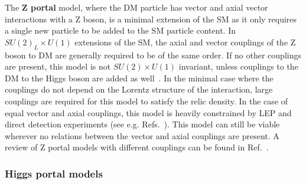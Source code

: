 The \textbf{Z portal} model, where the DM particle has vector and axial vector interactions with a Z boson, is a minimal extension of the SM as it only requires a single new particle to be added to the SM particle content. In $SU(2)_L \times U(1)$ extensions of the SM, the axial and vector couplings of the Z boson to DM are generally required to be of the same order. If no other couplings are present, this model is not $SU(2) \times U(1)$ invariant, unless couplings to the DM to the Higgs boson are added as well~\cite{Kahlhoefer:2015bea}. 
In the minimal case where the couplings do not depend on the Lorentz structure of the interaction, 
large couplings are required for this model to satisfy the relic density. 
In the case of equal vector and axial couplings, this model is heavily constrained by LEP and direct detection experiments (see e.g. Refs.~\cite{Arcadi:2014lta,Escudero:2016gzx}). This model can still be viable wherever no relations between the vector and axial couplings are present. A review of Z portal models with different couplings can be found in Ref.~\cite{Arcadi:2014lta}. 

\subsubsection{Higgs portal models}

